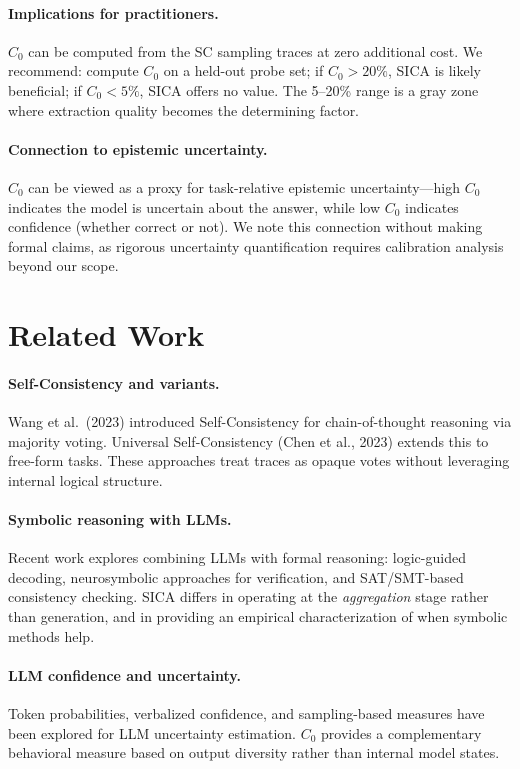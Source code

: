 \documentclass[11pt,a4paper]{article}
\begin{document}
\paragraph{Implications for practitioners.} $C_0$ can be computed from the SC sampling traces at zero additional cost. We recommend: compute $C_0$ on a held-out probe set; if $C_0 > 20\%$, SICA is likely beneficial; if $C_0 < 5\%$, SICA offers no value. The 5--20\% range is a gray zone where extraction quality becomes the determining factor.

\paragraph{Connection to epistemic uncertainty.} $C_0$ can be viewed as a proxy for task-relative epistemic uncertainty---high $C_0$ indicates the model is uncertain about the answer, while low $C_0$ indicates confidence (whether correct or not). We note this connection without making formal claims, as rigorous uncertainty quantification requires calibration analysis beyond our scope.

\section{Related Work}

\paragraph{Self-Consistency and variants.} Wang et al.\ (2023) introduced Self-Consistency for chain-of-thought reasoning via majority voting. Universal Self-Consistency (Chen et al., 2023) extends this to free-form tasks. These approaches treat traces as opaque votes without leveraging internal logical structure.

\paragraph{Symbolic reasoning with LLMs.} Recent work explores combining LLMs with formal reasoning: logic-guided decoding, neurosymbolic approaches for verification, and SAT/SMT-based consistency checking. SICA differs in operating at the \emph{aggregation} stage rather than generation, and in providing an empirical characterization of when symbolic methods help.

\paragraph{LLM confidence and uncertainty.} Token probabilities, verbalized confidence, and sampling-based measures have been explored for LLM uncertainty estimation. $C_0$ provides a complementary behavioral measure based on output diversity rather than internal model states.
\end{document}
